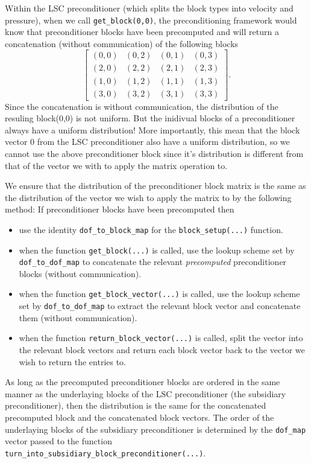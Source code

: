 Within the LSC preconditioner (which splits the block types into velocity and pressure), when we call \texttt{get\-\_block(0,0)}, the preconditioning framework would know that preconditioner blocks have been precomputed and will return a concatenation (without communication) of the following blocks
\begin{equation*}
\begin{bmatrix}
(0,0) & (0,2) & (0,1) & (0,3) \\
(2,0) & (2,2) & (2,1) & (2,3) \\
(1,0) & (1,2) & (1,1) & (1,3) \\
(3,0) & (3,2) & (3,1) & (3,3)
\end{bmatrix}.
\end{equation*}
Since the concatenation is without communication, the distribution of the resuling block(0,0) is not uniform. But the inidivual blocks of a preconditioner always have a uniform distribution! More importantly, this mean that the block vector 0 from the LSC preconditioner also have a uniform distribution, so we cannot use the above preconditioner block since it's distribution is different from that of the vector we with to apply the matrix operation to.

We ensure that the distribution of the preconditioner block matrix is the same as the distribution of the vector we wish to apply the matrix to by the following method: If preconditioner blocks have been precomputed then
\begin{itemize}
\item use the identity \texttt{dof\-\_to\-\_block\-\_map} for the \texttt{bloc\-k\_setup(...)} function.
\item when the function \texttt{get\-\_block(...)} is called, use the lookup scheme set by \texttt{dof\-\_to\-\_dof\-\_map} to concatenate the relevant \emph{precomputed} preconditioner blocks (without communication).
\item when the function \texttt{get\-\_block\-\_vector(...)} is called, use the lookup scheme set by \texttt{dof\-\_to\-\_dof\-\_map} to extract the relevant block vector and concatenate  them (without communication).
\item when the function \texttt{return\-\_block\-\_vector(...)} is called, split the vector into the relevant block vectors and return each block vector back to the vector we wish to return the entries to.
\end{itemize}
As long as the precomputed preconditioner blocks are ordered in the same manner as the underlaying blocks of the LSC preconditioner (the subsidiary preconditioner), then the distribution is the same for the concatenated precomputed block and the concatenated block vectors. The order of the underlaying blocks of the subsidiary preconditioner is determined by the \texttt{dof\-\_map} vector passed to the function \texttt{turn\-\_into\-\_subsidiary\-\_block\-\_preconditioner(...)}.


